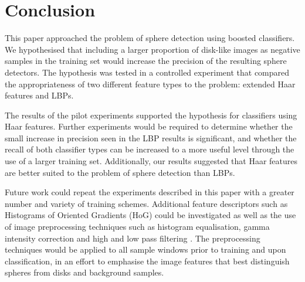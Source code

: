 \documentclass{sig-alternate-05-2015}
\newcommand{\tmpcomment}[1]{}
\newcommand{\citep}[1]{\cite{#1}}
\begin{document}
	\section{Conclusion} {
	\label{sec:conclusion}


		This paper approached the problem of sphere detection using boosted classifiers.
		We hypothesised that including a larger proportion of disk-like images as negative samples in the training set would increase the precision of the resulting sphere detectors.
		The hypothesis was tested in a controlled experiment that compared the appropriateness of two different feature types to the problem: extended Haar features\tmpcomment{, HoGs,} and LBPs.


    The results of the pilot experiments supported the hypothesis for classifiers using Haar features. Further experiments would be required to determine whether the small increase in precision seen in the LBP results is significant, and whether the recall of both classifier types can be increased to a more useful level through the use of a larger training set.
    Additionally, our results suggested that Haar features are better suited to the problem of sphere detection than LBPs.

		Future work could repeat the experiments described in this paper with a greater number and variety of training schemes.
    Additional feature descriptors such as Histograms of Oriented Gradients (HoG) could be investigated as well as the use of image preprocessing techniques such as histogram equalisation, gamma intensity correction and high and low pass filtering \citep{gross2003image}.
    The preprocessing techniques would be applied to all sample windows prior to training and upon classification, in an effort to emphasise the image features that best distinguish spheres from disks and background samples.

}
\end{document}

